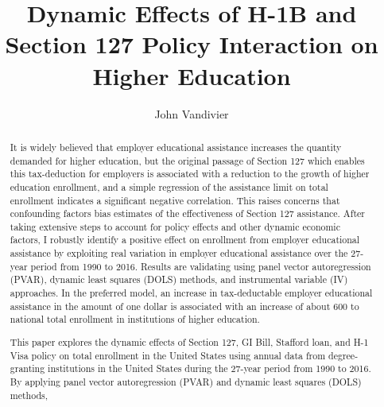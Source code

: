 \documentclass[review]{elsarticle}
\begin{document}
\begin{frontmatter}

\title{
    Dynamic Effects of H-1B and Section 127 Policy Interaction on Higher Education
}

\author[mymainaddress]{John Vandivier} %
\address[mymainaddress]{4400 University Dr, Fairfax, VA 22030}

\begin{abstract}
    It is widely believed that employer educational assistance increases the quantity demanded for higher education,
    but the original passage of Section 127 which enables this tax-deduction for employers is associated with a reduction to the growth of higher education enrollment,
    and a simple regression of the assistance limit on total enrollment indicates a significant negative correlation. %
    This raises concerns that confounding factors bias estimates of the effectiveness of Section 127 assistance.
    After taking extensive steps to account for policy effects and other dynamic economic factors,
    I robustly identify a positive effect on enrollment from employer educational assistance
    by exploiting real variation in employer educational assistance over the 27-year period from 1990 to 2016.
    Results are validating using panel vector autoregression (PVAR),
    dynamic least squares (DOLS) methods,
    and instrumental variable (IV) approaches.
    In the preferred model,
    an increase in tax-deductable employer educational assistance
    in the amount of one dollar is associated with
    an increase of about 600 to national total enrollment in institutions of higher education.


    This paper explores the dynamic effects of Section 127, GI Bill, Stafford loan, and H-1 Visa policy
    on total enrollment in the United States
    using annual data from degree-granting institutions in the United States during the 27-year period from 1990 to 2016.
    By applying panel vector autoregression (PVAR) and dynamic least squares (DOLS) methods,
    

\end{abstract}
\end{frontmatter}
\end{document}
